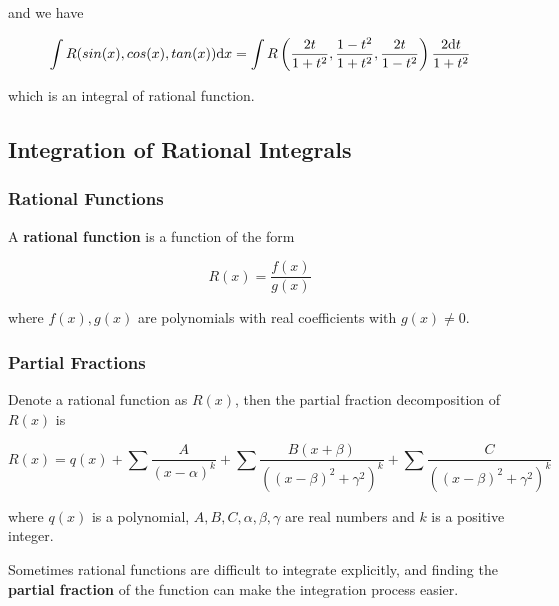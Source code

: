 \documentclass[a4paper,12pt]{article}
\begin{document}
and we have

$$\int R(sin(x),cos(x),tan(x))\mathrm{d} x=\int R\left( \frac{2t}{1+t^{2}},\frac{1-t^{2}}{1+t^{2}},\frac{2t}{1-t^{2}}\right)\frac{2\mathrm{d} t}{1+t^{2}}$$\s

which is an integral of rational function.

\subsection{Integration of Rational Integrals}
\subsubsection{Rational Functions}
\begin{dft}
  A \textbf{rational function} is a function of the form

  $$R(x)=\frac{f(x)}{g(x)}$$

  where $f(x),g(x)$ are polynomials with real coefficients with $g(x)\neq 0$.
\end{dft}

\subsubsection{Partial Fractions}
\begin{dft}
  Denote a rational function as $R(x)$, then the partial fraction decomposition of $R(x)$ is

  $$R(x)=q(x)+\sum\frac{A}{(x-\alpha)^{k}}+\sum\frac{B(x+\beta)}{((x-\beta)^{2}+\gamma^{2})^{k}}+\sum\frac{C}{((x-\beta)^{2}+\gamma^{2})^{k}}$$\s

  where $q(x)$ is a polynomial, $A,B,C,\alpha,\beta,\gamma$ are real numbers and $k$ is a positive integer.
\end{dft}\n

Sometimes rational functions are difficult to integrate explicitly, and finding the \textbf{partial fraction} of the function can make the integration process easier.\n
\end{document}
